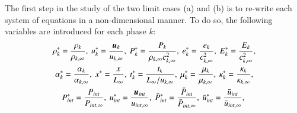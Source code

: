 \documentclass[preprint,10pt]{elsarticle}
\begin{document}
%
The first step in the study of the two limit cases (a) and (b) is to re-write each system of equations in a non-dimensional manner. To do so, the following variables are introduced for each phase $k$:
%
\begin{multline}
\label{eq:norm_param}
\rho_k^*   = \frac{\rho_k}{\rho_{k,\infty}}           ,\
u_k^*      = \frac{\boldsymbol u_k}{u_{k,\infty}}                 ,\
P_k^*      = \frac{P_k}{\rho_{k,\infty} c^2_{k,\infty}}   ,\
e_k^*      = \frac{e_k}{c^2_{k,\infty} }              , \
E_k^*      = \frac{E_k}{c^2_{k,\infty} }              , \\
\alpha_k^*      = \frac{\alpha_k}{\alpha_{k,\infty} }              , \
x^* = \frac{x}{L_\infty}                      ,\
t_k^* = \frac{t_k}{L_\infty / u_{k,\infty}}           ,\
\mu_k^*    = \frac{\mu_k}{\mu_{k,\infty}}             ,\
\kappa_k^* = \frac{\kappa_k}{\kappa_{k,\infty}}       ,\\
P_{int}^*    = \frac{P_{int}}{P_{int,\infty}}             ,\
u_{int}^* = \frac{\boldsymbol u_{int}}{u_{int,\infty}}       ,\
\bar{P}_{int}^*    = \frac{\bar{P}_{int}}{\bar{P}_{int,\infty}}             ,\
\bar{u}_{int}^* = \frac{\bar{u}_{int}}{\bar{u}_{int,\infty}}       ,\
\end{multline}
\end{document}
